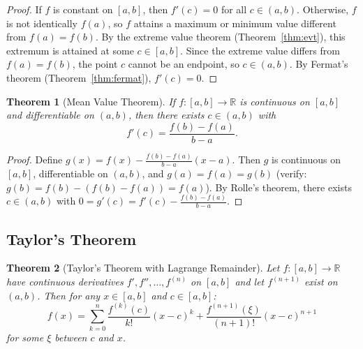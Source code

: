 \documentclass[11pt,a4paper]{article}
\theoremstyle{definition}
\theoremstyle{plain}
\newtheorem{theorem}{Theorem}[section]
\theoremstyle{remark}
\newcommand{\R}{\mathbb{R}}
\begin{document}
\begin{proof}
If $f$ is constant on $[a, b]$, then $f'(c) = 0$ for all $c \in (a, b)$.
Otherwise, $f$ is not identically $f(a)$, so $f$ attains a maximum or minimum
value different from $f(a) = f(b)$. By the extreme value theorem
(Theorem~\ref{thm:evt}), this extremum is attained at some $c \in [a, b]$.
Since the extreme value differs from $f(a) = f(b)$, the point $c$ cannot be
an endpoint, so $c \in (a, b)$. By Fermat's theorem (Theorem~\ref{thm:fermat}),
$f'(c) = 0$.
\end{proof}

\begin{theorem}[Mean Value Theorem]
\label{thm:mvt}
If $f : [a, b] \to \R$ is continuous on $[a, b]$ and differentiable on $(a, b)$,
then there exists $c \in (a, b)$ with
\[
f'(c) = \frac{f(b) - f(a)}{b - a}.
\]
\end{theorem}

\begin{proof}
Define $g(x) = f(x) - \frac{f(b) - f(a)}{b - a}(x - a)$. Then $g$ is continuous
on $[a, b]$, differentiable on $(a, b)$, and $g(a) = f(a) = g(b)$ (verify:
$g(b) = f(b) - (f(b) - f(a)) = f(a)$). By Rolle's theorem, there exists
$c \in (a, b)$ with $0 = g'(c) = f'(c) - \frac{f(b) - f(a)}{b - a}$.
\end{proof}

\subsection{Taylor's Theorem}
\label{subsec:taylor}

\begin{theorem}[Taylor's Theorem with Lagrange Remainder]
\label{thm:taylor}
Let $f : [a, b] \to \R$ have continuous derivatives $f', f'', \ldots, f^{(n)}$
on $[a, b]$ and let $f^{(n+1)}$ exist on $(a, b)$. Then for any $x \in [a, b]$
and $c \in [a, b]$:
\[
f(x) = \sum_{k=0}^{n} \frac{f^{(k)}(c)}{k!}(x - c)^k
+ \frac{f^{(n+1)}(\xi)}{(n+1)!}(x - c)^{n+1}
\]
for some $\xi$ between $c$ and $x$.
\end{theorem}
\end{document}
